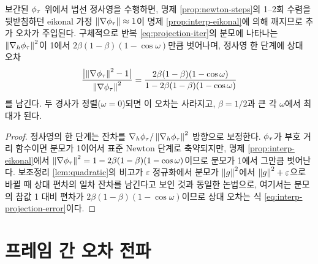 \begin{proposition}
\label{prop:interp-projection}
보간된 $\phi_\tau$ 위에서 법선 정사영을 수행하면, 명제 \ref{prop:newton-steps}의 1--2회
수렴을 뒷받침하던 eikonal 가정 $\left\lVert \nabla\phi_\tau \right\rVert\approx1$이 명제
\ref{prop:interp-eikonal}에 의해 깨지므로 추가 오차가 주입된다. 구체적으로 반복
\eqref{eq:projection-iter}의 분모에 나타나는 $\left\lVert \nabla_h\phi_\tau \right\rVert^2$이 1에서
$2\beta(1-\beta)(1-\cos\omega)$만큼 벗어나며, 정사영 한 단계에 상대 오차
\begin{equation}
  \frac{\bigl\lvert\left\lVert \nabla\phi_\tau \right\rVert^2-1\bigr\rvert}{\left\lVert \nabla\phi_\tau \right\rVert^2}
  = \frac{2\beta(1-\beta)(1-\cos\omega)}{1-2\beta(1-\beta)(1-\cos\omega)}
  \label{eq:interp-projection-error}
\end{equation}
를 남긴다. 두 경사가 정렬($\omega=0$)되면 이 오차는 사라지고, $\beta=1/2$과 큰 각
$\omega$에서 최대가 된다.
\end{proposition}

\begin{proof}
정사영의 한 단계는 잔차를 $\nabla_h\phi_\tau/\left\lVert \nabla_h\phi_\tau \right\rVert^2$ 방향으로
보정한다. $\phi_\tau$가 부호 거리 함수이면 분모가 1이어서 표준 Newton 단계로
축약되지만, 명제 \ref{prop:interp-eikonal}에서
$\left\lVert \nabla\phi_\tau \right\rVert^2 = 1-2\beta(1-\beta)(1-\cos\omega)$이므로 분모가 1에서 그만큼
벗어난다. 보조정리 \ref{lem:quadratic}의 비고가 $\varepsilon$ 정규화에서 분모가
$\left\lVert g \right\rVert^2$에서 $\left\lVert g \right\rVert^2+\varepsilon$으로 바뀔 때 상대 편차의 일차 잔차를
남긴다고 보인 것과 동일한 논법으로, 여기서는 분모의 참값 1 대비 편차가
$2\beta(1-\beta)(1-\cos\omega)$이므로 상대 오차는 식
\eqref{eq:interp-projection-error}이다.
\end{proof}


\section{프레임 간 오차 전파}
\label{sec:propagation}

